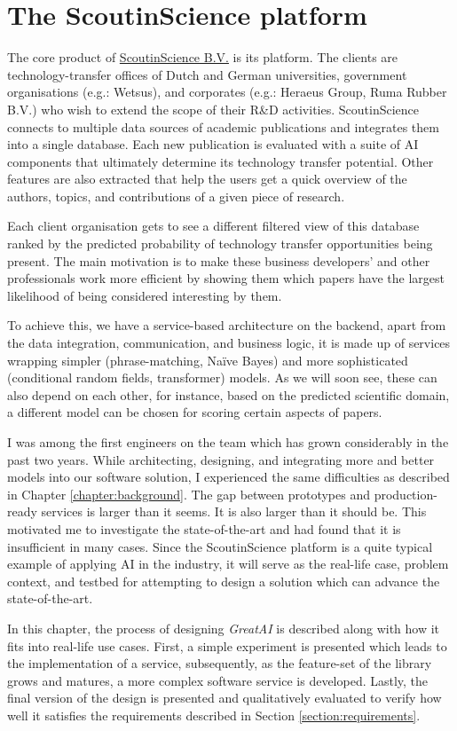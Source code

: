 \chapter{The ScoutinScience platform} \label{chapter:case}

The core product of \href{https://scoutinscience.com/}{ScoutinScience B.V.} is its platform. The clients are technology-transfer offices of Dutch and German universities, government organisations (e.g.: Wetsus), and corporates (e.g.: Heraeus Group, Ruma Rubber B.V.) who wish to extend the scope of their R\&D activities. ScoutinScience connects to multiple data sources of academic publications and integrates them into a single database. Each new publication is evaluated with a suite of AI components that ultimately determine its technology transfer potential. Other features are also extracted that help the users get a quick overview of the authors, topics, and contributions of a given piece of research.

Each client organisation gets to see a different filtered view of this database ranked by the predicted probability of technology transfer opportunities being present. The main motivation is to make these business developers' and other professionals work more efficient by showing them which papers have the largest likelihood of being considered interesting by them. 

To achieve this, we have a service-based architecture \cite{kleppmann2017designing} on the backend, apart from the data integration, communication, and business logic, it is made up of services wrapping simpler (phrase-matching, Naïve Bayes) and more sophisticated (conditional random fields, transformer) models. As we will soon see, these can also depend on each other, for instance, based on the predicted scientific domain, a different model can be chosen for scoring certain aspects of papers.

I was among the first engineers on the team which has grown considerably in the past two years. While architecting, designing, and integrating more and better models into our software solution, I experienced the same difficulties as described in Chapter \ref{chapter:background}. The gap between prototypes and production-ready services is larger than it seems. It is also larger than it should be. This motivated me to investigate the state-of-the-art and had found that it is insufficient in many cases. Since the ScoutinScience platform is a quite typical example of applying AI in the industry, it will serve as the real-life case, problem context, and testbed for attempting to design a solution which can advance the state-of-the-art.

In this chapter, the process of designing \textit{GreatAI} is described along with how it fits into real-life use cases. First, a simple experiment is presented which leads to the implementation of a service, subsequently, as the feature-set of the library grows and matures, a more complex software service is developed. Lastly, the final version of the design is presented and qualitatively evaluated to verify how well it satisfies the requirements described in Section \ref{section:requirements}.



